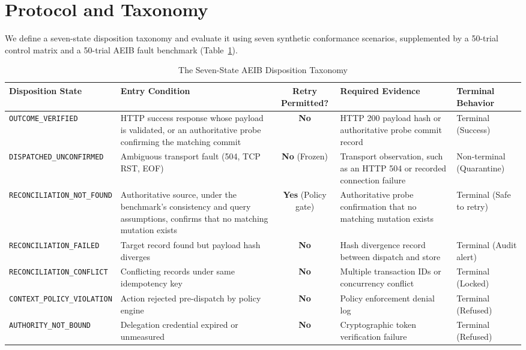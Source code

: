 \documentclass[10pt,journal,compsoc]{IEEEtran}
\begin{document}
\section{Protocol and Taxonomy}

We define a seven-state disposition taxonomy and evaluate it using seven synthetic conformance scenarios, supplemented by a 50-trial control matrix and a 50-trial AEIB fault benchmark (Table~\ref{tab:taxonomy}).

\begin{table}[t]
\caption{The Seven-State AEIB Disposition Taxonomy}
\label{tab:taxonomy}
\centering
\begin{tabular}{lp{4.2cm}cp{4.5cm}l}
\toprule
\textbf{Disposition State} & \textbf{Entry Condition} & \textbf{Retry Permitted?} & \textbf{Required Evidence} & \textbf{Terminal Behavior} \\
\midrule
\texttt{OUTCOME\_VERIFIED} & HTTP success response whose payload is validated, or an authoritative probe confirming the matching commit & \textbf{No} & HTTP 200 payload hash or authoritative probe commit record & Terminal (Success) \\
\texttt{DISPATCHED\_UNCONFIRMED} & Ambiguous transport fault (504, TCP RST, EOF) & \textbf{No} (Frozen) & Transport observation, such as an HTTP 504 or recorded connection failure & Non-terminal (Quarantine) \\
\texttt{RECONCILIATION\_NOT\_FOUND} & Authoritative source, under the benchmark's consistency and query assumptions, confirms that no matching mutation exists & \textbf{Yes} (Policy gate) & Authoritative probe confirmation that no matching mutation exists & Terminal (Safe to retry) \\
\texttt{RECONCILIATION\_FAILED} & Target record found but payload hash diverges & \textbf{No} & Hash divergence record between dispatch and store & Terminal (Audit alert) \\
\texttt{RECONCILIATION\_CONFLICT} & Conflicting records under same idempotency key & \textbf{No} & Multiple transaction IDs or concurrency conflict & Terminal (Locked) \\
\texttt{CONTEXT\_POLICY\_VIOLATION} & Action rejected pre-dispatch by policy engine & \textbf{No} & Policy enforcement denial log & Terminal (Refused) \\
\texttt{AUTHORITY\_NOT\_BOUND} & Delegation credential expired or unmeasured & \textbf{No} & Cryptographic token verification failure & Terminal (Refused) \\
\bottomrule
\end{tabular}
\end{table}
\end{document}
